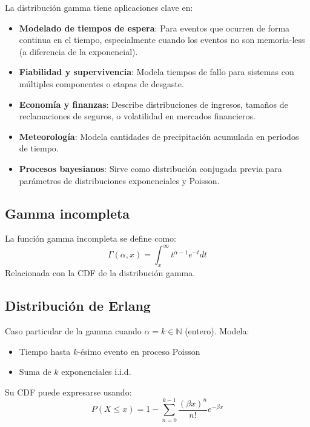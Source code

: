 \documentclass[letterpaper]{article}
\begin{document}
	La distribución gamma tiene aplicaciones clave en:
	\begin{itemize}
		\item \textbf{Modelado de tiempos de espera}: Para eventos que ocurren de forma continua en el tiempo, especialmente cuando los eventos no son memoria-less (a diferencia de la exponencial).
		
		\item \textbf{Fiabilidad y supervivencia}: Modela tiempos de fallo para sistemas con múltiples componentes o etapas de desgaste.
		
		\item \textbf{Economía y finanzas}: Describe distribuciones de ingresos, tamaños de reclamaciones de seguros, o volatilidad en mercados financieros.
		
		\item \textbf{Meteorología}: Modela cantidades de precipitación acumulada en periodos de tiempo.
		
		\item \textbf{Procesos bayesianos}: Sirve como distribución conjugada previa para parámetros de distribuciones exponenciales y Poisson.
	\end{itemize}
	
	\subsection{Gamma incompleta}
	La función gamma incompleta se define como:
	\[
	\Gamma(\alpha, x) = \int_x^\infty t^{\alpha-1} e^{-t} dt
	\]
	Relacionada con la CDF de la distribución gamma.
	
	\subsection{Distribución de Erlang}
	Caso particular de la gamma cuando $\alpha = k \in \mathbb{N}$ (entero). Modela:
	\begin{itemize}
		\item Tiempo hasta $k$-ésimo evento en proceso Poisson
		\item Suma de $k$ exponenciales i.i.d.
	\end{itemize}
	Su CDF puede expresarse usando:
	\[
	P(X \leq x) = 1 - \sum_{n=0}^{k-1} \frac{(\beta x)^n}{n!} e^{-\beta x}
	\]
	
\end{document}
